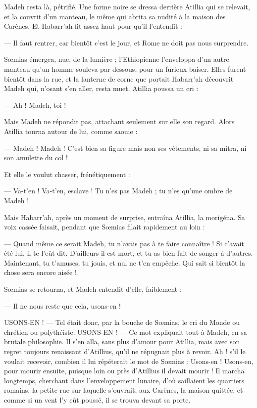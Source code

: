 \documentclass[a4paper, 11pt, oneside, polutonikogreek, french]{article}
\begin{document}
Madeh resta là, pétrifié. Une forme noire se dressa derrière Atillia qui se relevait, et la couvrit d'un manteau, le même qui abrita sa nudité à la maison des Carènes. Et Habarr'ah fit assez haut pour qu'il l'entendît :

--- Il faut rentrer, car bientôt c'est le jour, et Rome ne doit pas nous surprendre.

Sœmias émergea, nue, de la lumière ; l'Ethiopienne l'enveloppa d'un autre manteau qu'un homme souleva par dessous, pour un furieux baiser. Elles furent bientôt dans la rue, et la lanterne de corne que portait Habarr'ah découvrit Madeh qui, n'osant s'en aller, resta muet. Atillia poussa un cri :

--- Ah ! Madeh, toi !

Mais Madeh ne répondit pas, attachant seulement sur elle son regard. Alors Atillia tourna autour de lui, comme saouie :

--- Madeh ! Madeh ! C'est bien sa figure mais non ses vêtements, ni sa mitra, ni son amulette du col !

Et elle le voulut chasser, frénétiquement :

--- Va-t'en ! Va-t'en, esclave ! Tu n'es pas Madeh ; tu n'es qu'une ombre de Madeh !

Mais Habarr'ah, après un moment de surprise, entraîna Atillia, la morigéna. Sa voix cassée faisait, pendant que Sœmias filait rapidement au loin :

--- Quand même ce serait Madeh, tu n'avais pas à te faire connaître ! Si c'avait été lui, il te l'eût dit. D'ailleurs il est mort, et tu as bien fait de songer à d'autres. Maintenant, tu t'amuses, tu jouis, et nul ne t'en empêche. Qui sait si bientôt la chose sera encore aisée !

Sœmias se retourna, et Madeh entendit d'elle, faiblement :

--- Il ne nous reste que cela, usons-en !

USONS-EN ! --- Tel était donc, par la bouche de Sœmias, le cri du Monde ou chrétien ou polythéiste. USONS-EN ! --- Ce mot expliquait tout à Madeh, en sa brutale philosophie. Il s'en alla, sans plus d'amour pour Atillia, mais avec son regret toujours renaissant d'Atillius, qu'il ne répugnait plus à revoir. Ah ! s'il le voulait recevoir, combien il lui répéterait le mot de Sœmias : Usons-en ! Usons-en, pour mourir ensuite, puisque loin ou près d'Atillius il devait mourir ! Il marcha longtemps, cherchant dans l'enveloppement lunaire, d'où saillaient les quartiers romains, la petite rue sur laquelle s'ouvrait, aux Carènes, la maison quittée, et comme si un vent l'y eût poussé, il se trouva devant sa porte.
\end{document}
